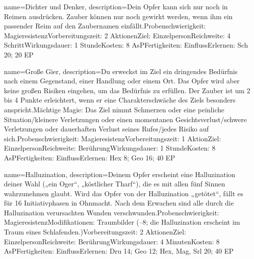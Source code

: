 {
    name={Dichter und Denker},
    description={Dein Opfer kann sich nur noch in Reimen ausdrücken. Zauber können nur noch gewirkt werden, wenn ihm ein passender Reim auf den Zaubernamen einfällt.\newline Probenschwierigkeit: Magieresistenz\newline Vorbereitungszeit: 2 Aktionen\newline Ziel: Einzelperson\newline Reichweite: 4 Schritt\newline Wirkungsdauer: 1 Stunde\newline Kosten: 8 AsP\newline Fertigkeiten: Einfluss\newline Erlernen: Sch 20; 20 EP}
}


{
    name={Große Gier},
    description={Du erweckst im Ziel ein dringendes Bedürfnis nach einem Gegenstand, einer Handlung oder einem Ort. Das Opfer wird aber keine großen Risiken eingehen, um das Bedürfnis zu erfüllen. Der Zauber ist um 2 bis 4 Punkte erleichtert, wenn er eine Charakterschwäche des Ziels besonders anspricht.\newline Mächtige Magie: Das Ziel nimmt Schmerzen oder eine peinliche Situation/kleinere Verletzungen oder einen momentanen Gesichtsverlust/schwere Verletzungen oder dauerhaften Verlust seines Rufes/jedes Risiko auf sich.\newline Probenschwierigkeit: Magieresistenz\newline Vorbereitungszeit: 1 Aktion\newline Ziel: Einzelperson\newline Reichweite: Berührung\newline Wirkungsdauer: 1 Stunde\newline Kosten: 8 AsP\newline Fertigkeiten: Einfluss\newline Erlernen: Hex 8; Geo 16; 40 EP}
}


{
    name={Halluzination},
    description={Deinem Opfer erscheint eine Halluzination deiner Wahl („ein Oger“, „köstlicher Tharf“), die es mit allen fünf Sinnen wahrzunehmen glaubt. Wird das Opfer von der Halluzination „getötet“, fällt es für 16 Initiativphasen in Ohnmacht. Nach dem Erwachen sind alle durch die Halluzination verursachten Wunden verschwunden.\newline Probenschwierigkeit: Magieresistenz\newline Modifikationen: Traumbilder (–8; die Halluzination erscheint im Traum eines Schlafenden.)\newline Vorbereitungszeit: 2 Aktionen\newline Ziel: Einzelperson\newline Reichweite: Berührung\newline Wirkungsdauer: 4 Minuten\newline Kosten: 8 AsP\newline Fertigkeiten: Einfluss\newline Erlernen: Dru 14; Geo 12; Hex, Mag, Srl 20; 40 EP}
}


